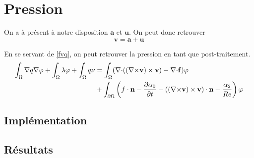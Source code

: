 \chapter{Pression}
On a à présent à notre disposition $\bm{a}$ et $\bm{u}$. On peut donc retrouver \[ \bm{v}=\bm{a}+\bm{u} \]

En se servant de \ref{fvq}, on peut retrouver la pression en tant que post-traitement.
\begin{align*}
\int_\Omega {\nabla} q{\nabla}\varphi + \int_\Omega \lambda\varphi + \int_\Omega q\nu &= \int_\Omega ({\nabla\cdot}(({\nabla\times} \mathbf{v})\times \mathbf{v}) -{\nabla\cdot} \mathbf{f})\varphi\\
&+ \int_{\partial\Omega} \left(f\cdot \mathbf{n} - \frac{\partial\alpha_0}{\partial t} - (({\nabla\times} \mathbf{v})\times \mathbf{v})\cdot \mathbf{n} - \frac{\alpha_2}{Re}\right)\varphi
\end{align*}

\section{Implémentation}
\section{Résultats}

